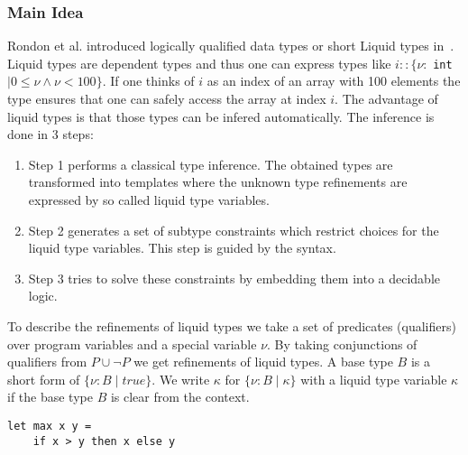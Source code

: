 \documentclass[a4paper,UKenglish]{lipics-v2016}
\begin{document}
\subsubsection{Main Idea}

Rondon et al. introduced logically qualified data types or short Liquid types in~\cite{Rondon:2008:LT}.
Liquid types are dependent types and thus one can express types like $i:: \{\nu:$ \lstinline{int} $\mid 0 \le \nu \land \nu < 100\}$.
If one thinks of $i$ as an index of an array with 100 elements the type ensures that one can safely access the array at index $i$.
The advantage of liquid types is that those types can be infered automatically.
The inference is done in 3 steps:
\begin{enumerate}
    \item Step 1 performs a classical type inference.
        The obtained types are transformed into templates where the unknown type refinements are expressed by so called liquid type variables.
    \item Step 2 generates a set of subtype constraints which restrict choices for the liquid type variables.
        This step is guided by the syntax.
    \item Step 3 tries to solve these constraints by embedding them into a decidable logic.
\end{enumerate}

To describe the refinements of liquid types we take a set of predicates (qualifiers) over program variables and a special variable $\nu$.
By taking conjunctions of qualifiers from $P \cup \neg P$ we get refinements of liquid types.
A base type $B$ is a short form of $\{\nu: B \mid true\}$.
We write $\kappa$ for $\{\nu: B \mid \kappa\}$ with a liquid type variable $\kappa$ if the base type $B$ is clear from the context.

\begin{lstlisting}[caption={Example Program},label=lst:exmpl,captionpos=t,float,abovecaptionskip=-\medskipamount]
let max x y =
    if x > y then x else y
\end{lstlisting}
\end{document}
